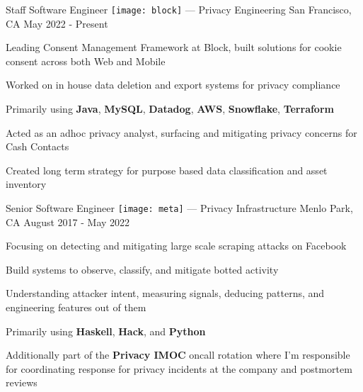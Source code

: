 


\begin{cventries}


\cventry
{Staff Software Engineer} %
{{\texttt{[image: block]}} --- Privacy Engineering} %
{San Francisco, CA} %
{May 2022 - Present} %
{ %
\begin{cvitems}
\item {Leading Consent Management Framework at Block, built solutions for cookie consent across both Web and Mobile}
\item {Worked on in house data deletion and export systems for privacy compliance}
\item {Primarily using \textbf{Java}, \textbf{MySQL}, \textbf{Datadog}, \textbf{AWS}, \textbf{Snowflake}, \textbf{Terraform}}
\item {Acted as an adhoc privacy analyst, surfacing and mitigating privacy concerns for Cash Contacts}
\item {Created long term strategy for purpose based data classification and asset inventory}
\end{cvitems}
}


\cventry
{Senior Software Engineer} %
{{\texttt{[image: meta]}} --- Privacy Infrastructure} %
{Menlo Park, CA} %
{August 2017 - May 2022} %
{ %
\begin{cvitems}
\item {Focusing on detecting and mitigating large scale scraping attacks on Facebook}
\item {Build systems to observe, classify, and mitigate botted activity}
\item {Understanding attacker intent, measuring signals, deducing patterns, and engineering features out of them}
\item {Primarily using \textbf{Haskell}, \textbf{Hack}, and \textbf{Python}}
\item {Additionally part of the \textbf{Privacy IMOC} oncall rotation where I'm responsible for coordinating response for privacy incidents at the company and postmortem reviews}
\end{cvitems}
}


\end{cventries}
